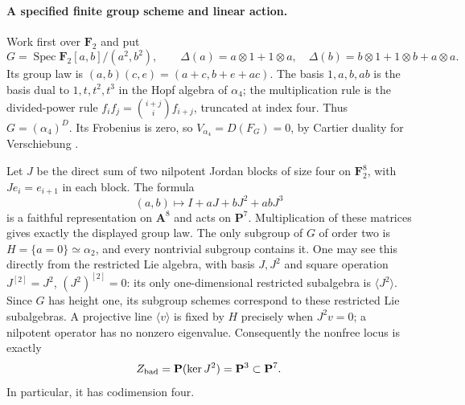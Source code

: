 \paragraph{A specified finite group scheme and linear action.}
Work first over $\mathbf F_2$ and put
\[
 G=\operatorname{Spec}\mathbf F_2[a,b]/(a^2,b^2),\qquad
 \Delta(a)=a\otimes1+1\otimes a,\quad
 \Delta(b)=b\otimes1+1\otimes b+a\otimes a.
\]
Its group law is
$(a,b)(c,e)=(a+c,b+e+ac)$.  The basis $1,a,b,ab$ is the basis dual
to $1,t,t^2,t^3$ in the Hopf algebra of $\alpha_4$; the multiplication
rule is the divided-power rule
$f_if_j=\binom{i+j}{i}f_{i+j}$, truncated at index four.  Thus
$G=(\alpha_4)^D$.  Its Frobenius is zero, so
$V_{\alpha_4}=D(F_G)=0$, by Cartier duality for Verschiebung
\cite[Proposition~5.19]{EdixhovenVanDerGeerMoonenAV}.

Let $J$ be the direct sum of two nilpotent Jordan blocks of size
four on $\mathbf F_2^8$, with $J e_i=e_{i+1}$ in each block.
The formula
\begin{equation}\label{eq:alpha4-regular-action}
 (a,b)\longmapsto I+aJ+bJ^2+abJ^3
\end{equation}
is a faithful representation on $\mathbf A^8$ and acts on
$\mathbf P^7$.  Multiplication of these matrices gives exactly the
displayed group law.
The only subgroup of $G$ of order two is
$H=\{a=0\}\simeq\alpha_2$, and every nontrivial subgroup contains it.
One may see this directly from the restricted Lie algebra, with
basis $J,J^2$ and square operation $J^{[2]}=J^2$, $(J^2)^{[2]}=0$:
its only one-dimensional restricted subalgebra is $\langle J^2\rangle$.
Since $G$ has height one, its subgroup schemes correspond to these
restricted Lie subalgebras.  A projective line $\langle v\rangle$
is fixed by $H$ precisely when $J^2v=0$; a nilpotent operator has
no nonzero eigenvalue.  Consequently the nonfree locus is exactly
\[
 Z_{\rm bad}=\mathbf P(\ker J^2)=\mathbf P^3\subset\mathbf P^7.
\]
In particular, it has codimension four.

